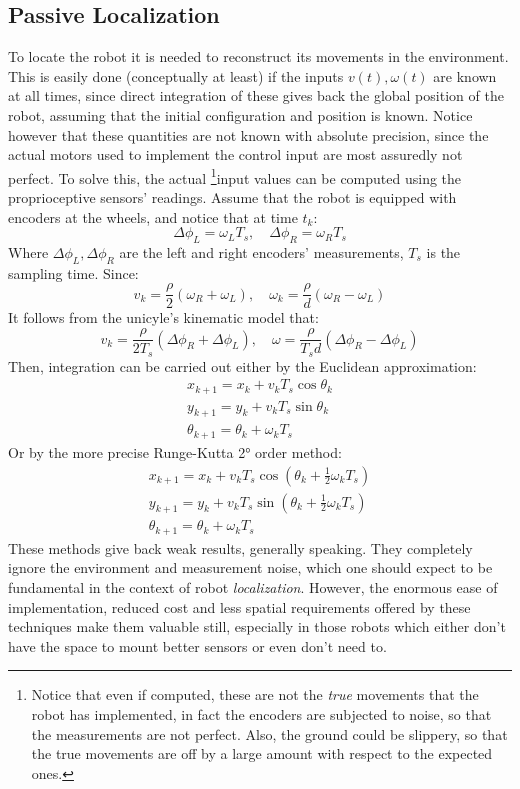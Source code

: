 \subsection{Passive Localization}
To locate the robot it is needed to reconstruct its movements in the environment. This is easily done (conceptually at least) if the inputs $v(t),\omega(t)$ are known at all times, since direct integration of these gives back the global position of the robot, assuming that the initial configuration and position is known. Notice however that these quantities are not known with absolute precision, since the actual motors used to implement the control input are most assuredly not perfect. To solve this, the actual \footnote{Notice that even if computed, these are not the \textit{true} movements that the robot has implemented, in fact the encoders are subjected to noise, so that the measurements are not perfect. Also, the ground could be slippery, so that the true movements are off by a large amount with respect to the expected ones.}input values can be computed using the proprioceptive sensors' readings. Assume that the robot is equipped with encoders at the wheels, and notice that at time $t_k$:
\begin{equation*}
    \Delta\phi_L=\omega_LT_s, \quad \Delta\phi_R=\omega_RT_s
\end{equation*}
Where $\Delta\phi_L,\Delta\phi_R$ are the left and right encoders' measurements, $T_s$ is the sampling time. Since:
\begin{equation*}
    v_k=\frac{\rho}{2}(\omega_R+\omega_L), \quad \omega_k=\frac{\rho}{d}(\omega_R-\omega_L)
\end{equation*}
It follows from the unicyle's kinematic model that:
\begin{equation*}
    v_k=\frac{\rho}{2T_s}(\Delta\phi_R+\Delta\phi_L),\quad \omega=\frac{\rho}{T_sd}(\Delta\phi_R-\Delta\phi_L)
\end{equation*}
Then, integration can be carried out either by the Euclidean approximation:
\begin{gather*}
    x_{k+1}=x_k+v_kT_s\cos\theta_k\\
    y_{k+1}=y_k+v_kT_s\sin\theta_k\\
    \theta_{k+1}=\theta_k+\omega_kT_s
\end{gather*}
Or by the more precise Runge-Kutta 2° order method:
\begin{gather*}
    x_{k+1}=x_k+v_kT_s\cos\left(\theta_k+\frac{1}{2}\omega_kT_s\right)\\
    y_{k+1}=y_k+v_kT_s\sin\left(\theta_k+\frac{1}{2}\omega_kT_s\right)\\
    \theta_{k+1}=\theta_k+\omega_kT_s
\end{gather*}
These methods give back weak results, generally speaking. They completely ignore the environment and measurement noise, which one should expect to be fundamental in the context of robot \textit{localization}. However, the enormous ease of implementation, reduced cost and less spatial requirements offered by these techniques make them valuable still, especially in those robots which either don't have the space to mount better sensors or even don't need to.